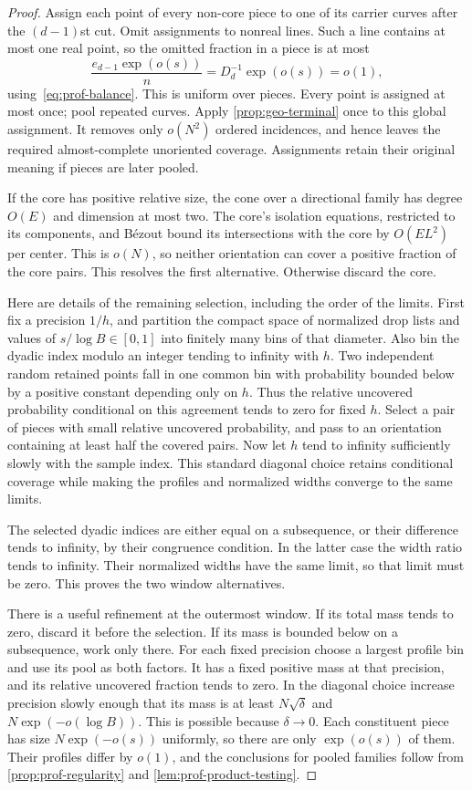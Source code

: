 \begin{proof}
Assign each point of every non-core piece to one of its carrier curves after the $(d-1)$st cut.  Omit assignments to nonreal lines. Such a line contains at most one real point, so the omitted fraction in a piece is at most
\[
 \frac{e_{d-1}\exp(o(s))}{n}
 =D_d^{-1}\exp(o(s))=o(1),
\]
using~\eqref{eq:prof-balance}.  This is uniform over pieces.  Every point is assigned at most once; pool repeated curves.  Apply \cref{prop:geo-terminal} once to this global assignment.  It removes only $o(N^2)$ ordered incidences, and hence leaves the required almost-complete unoriented coverage.  Assignments retain their original meaning if pieces are later pooled.

If the core has positive relative size, the cone over a directional family has degree $O(E)$ and dimension at most two. The core's isolation equations, restricted to its components, and B\'ezout bound its intersections with the core by $O(EL^2)$ per center.  This is $o(N)$, so neither orientation can cover a positive fraction of the core pairs.  This resolves the first alternative.  Otherwise discard the core.

Here are details of the remaining selection, including the order of the limits.  First fix a precision $1/h$, and partition the compact space of normalized drop lists and values of $s/\log B\in[0,1]$ into finitely many bins of that diameter. Also bin the dyadic index modulo an integer tending to infinity with $h$.  Two independent random retained points fall in one common bin with probability bounded below by a positive constant depending only on $h$.  Thus the relative uncovered probability conditional on this agreement tends to zero for fixed $h$. Select a pair of pieces with small relative uncovered probability, and pass to an orientation containing at least half the covered pairs.  Now let $h$ tend to infinity sufficiently slowly with the sample index.  This standard diagonal choice retains conditional coverage while making the profiles and normalized widths converge to the same limits.

The selected dyadic indices are either equal on a subsequence, or their difference tends to infinity, by their congruence condition.  In the latter case the width ratio tends to infinity. Their normalized widths have the same limit, so that limit must be zero.  This proves the two window alternatives.

There is a useful refinement at the outermost window.  If its total mass tends to zero, discard it before the selection.  If its mass is bounded below on a subsequence, work only there. For each fixed precision choose a largest profile bin and use its pool as both factors.  It has a fixed positive mass at that precision, and its relative uncovered fraction tends to zero. In the diagonal choice increase precision slowly enough that its mass is at least $N\sqrt\delta$ and $N\exp(-o(\log B))$.  This is possible because $\delta\to0$. Each constituent piece has size $N\exp(-o(s))$ uniformly, so there are only $\exp(o(s))$ of them.  Their profiles differ by $o(1)$, and the conclusions for pooled families follow from \cref{prop:prof-regularity} and \cref{lem:prof-product-testing}.


\end{proof}
